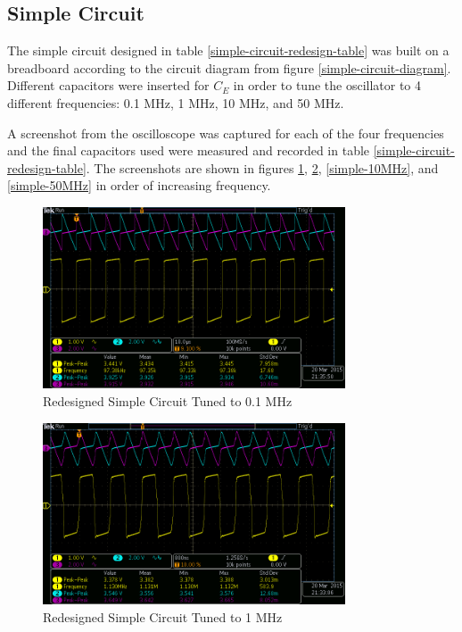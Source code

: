 \documentclass[titlepage, letterpaper, 10.5pt]{article}
\begin{document}
\subsection{Simple Circuit}

The simple circuit designed in table \ref{simple-circuit-redesign-table}
was built on a breadboard according to the circuit diagram from figure
\ref{simple-circuit-diagram}. Different capacitors were inserted for $C_{E}$
in order to tune the oscillator to 4 different frequencies: 0.1 MHz, 1 MHz, 10 MHz, and 50 MHz.

A screenshot from the oscilloscope was captured for each of the four frequencies and the final
capacitors used were measured and recorded in table
\ref{simple-circuit-redesign-table}. The screenshots are shown in figures \ref{simple-100kHz},
\ref{simple-1MHz}, \ref{simple-10MHz}, and \ref{simple-50MHz} in order of increasing frequency.

\begin{figure}[ht]
	\centering
	\includegraphics[width=0.8\textwidth]{results/simple-100kHz}
	\caption{Redesigned Simple Circuit Tuned to 0.1 MHz}
	\label{simple-100kHz}
\end{figure}

\begin{figure}[ht]
	\centering
	\includegraphics[width=0.8\textwidth]{results/simple-1MHz}
	\caption{Redesigned Simple Circuit Tuned to 1 MHz}
	\label{simple-1MHz}
\end{figure}
\end{document}
